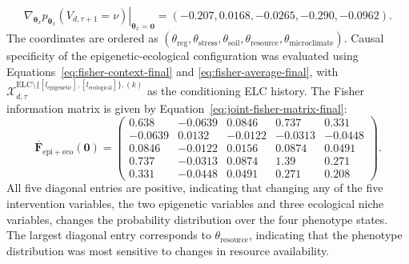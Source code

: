 \documentclass[11pt]{article}
\newcommand{\ELC}{\mathrm{ELC}}
\begin{document}
\begin{equation}
\left.
\nabla_{\boldsymbol{\theta}_x}
p_{\boldsymbol{\theta}_x}\left(
V_{d,\tau+1}=\nu
\right)
\right|_{\boldsymbol{\theta}_x=\mathbf{0}}
=
\left(
-0.207,
0.0168,
-0.0265,
-0.290,
-0.0962
\right).
\label{eq:joint-local-gradient}
\end{equation}
The coordinates are ordered as
$(\theta_{\mathrm{reg}},
\theta_{\mathrm{stress}},
\theta_{\mathrm{soil}},
\theta_{\mathrm{resource}},
\theta_{\mathrm{microclimate}})$.
Causal specificity of the epigenetic-ecological configuration was evaluated using Equations~\ref{eq:fisher-context-final} and \ref{eq:fisher-average-final}, with $\mathcal{X}^{\ELC\setminus\{[l_{\mathrm{epigenetic}}],[l_{\mathrm{ecological}}]\},(k)}_{d,\tau}$ as the conditioning ELC history. The Fisher information matrix is given by Equation~\ref{eq:joint-fisher-matrix-final}:
\begin{equation}
\overline{\mathbf{F}}_{\mathrm{epi+eco}}(\mathbf{0})
=
\begin{pmatrix}
0.638 & -0.0639 & 0.0846 & 0.737 & 0.331 \\
-0.0639 & 0.0132 & -0.0122 & -0.0313 & -0.0448 \\
0.0846 & -0.0122 & 0.0156 & 0.0874 & 0.0491 \\
0.737 & -0.0313 & 0.0874 & 1.39 & 0.271 \\
0.331 & -0.0448 & 0.0491 & 0.271 & 0.208
\end{pmatrix}.
\label{eq:joint-fisher-matrix-final}
\end{equation}
All five diagonal entries are positive, indicating that changing any of the five intervention variables, the two epigenetic variables and three ecological niche variables, changes the probability distribution over the four phenotype states. The largest diagonal entry corresponds to $\theta_{\mathrm{resource}}$, indicating that the phenotype distribution was most sensitive to changes in resource availability.
\end{document}

